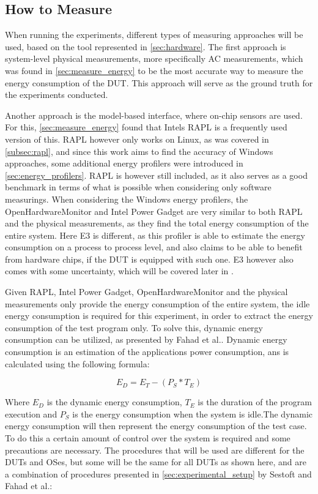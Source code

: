 \subsection{How to Measure}

When running the experiments, different types of measuring approaches will be used, based on the tool represented in \cref*{sec:hardware}. The first approach is system-level physical measurements, more specifically AC measurements, which was found in \cref*{sec:measure_energy} to be the most accurate way to measure the energy consumption of the DUT. This approach will serve as the ground truth for the experiments conducted.

Another approach is the model-based interface, where on-chip sensors are used. For this, \cref*{sec:measure_energy} found that Intels RAPL is a frequently used version of this. RAPL however only works on Linux, as was covered in \cref*{subsec:rapl}, and since this work aims to find the accuracy of Windows approaches, some additional energy profilers were introduced in \cref*{sec:energy_profilers}. RAPL is however still included, as it also serves as a good benchmark in terms of what is possible when considering only software measurings. When considering the Windows energy profilers, the OpenHardwareMonitor and Intel Power Gadget are very similar to both RAPL and the physical measurements, as they find the total energy consumption of the entire system. Here E3 is different, as this profiler is able to estimate the energy consumption on a process to process level, and also claims to be able to benefit from hardware chips, if the DUT is equipped with such one. E3 however also comes with some uncertainty, which will be covered later in .

Given RAPL, Intel Power Gadget, OpenHardwareMonitor and the physical measurements only provide the energy consumption of the entire system, the idle energy consumption is required for this experiment, in order to extract the energy consumption of the test program only. To solve this, dynamic energy consumption can be utilized, as presented by Fahad et al.\cite*[]{fahad2019comparative}. Dynamic energy consumption is an estimation of the applications power consumption, ans is calculated using the following formula:

\begin{equation}
    E_D = E_T -(P_S * T_E)
\end{equation}

Where $E_D$ is the dynamic energy consumption, $T_E$ is the duration of the program execution and $P_S$ is the energy consumption when the system is idle.The dynamic energy consumption will then represent the energy consumption of the test case. To do this a certain amount of control over the system is required and some precautions are necessary. The procedures that will be used are different for the DUTs and OSes, but some will be the same for all DUTs as shown here, and are a combination of procedures presented in \cref*{sec:experimental_setup} by Sestoft\cite*[]{sestoft2013microbenchmarks} and Fahad et al.\cite*[]{fahad2019comparative}:

